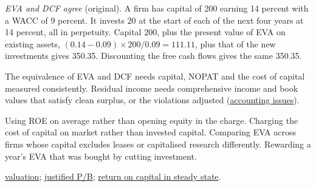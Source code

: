 \begin{qfdefinition}
\emph{EVA and DCF agree} (original). A firm has capital of 200 earning 14 percent with a WACC of 9 percent. It invests 20 at the start of each of the next four years at 14 percent, all in perpetuity. Capital 200, plus the present value of EVA on existing assets, $(0.14-0.09)\times200/0.09=111.11$, plus that of the new investments gives 350.35. Discounting the free cash flows gives the same 350.35.

 The equivalence of EVA and DCF needs capital, NOPAT and the cost of capital measured consistently. Residual income needs comprehensive income and book values that satisfy clean surplus, or the violations adjusted (\hyperref[meth:residual-income-comparison]{accounting issues}).

 Using ROE on average rather than opening equity in the charge. Charging the cost of capital on market rather than invested capital. Comparing EVA across firms whose capital excludes leases or capitalised research differently. Rewarding a year's EVA that was bought by cutting investment.

 \hyperref[meth:residual-income-valuation]{valuation}; \hyperref[meth:justified-multiples]{justified P/B}; \hyperref[meth:forecast-horizon-steady-state]{return on capital in steady state}.

\end{qfdefinition}

